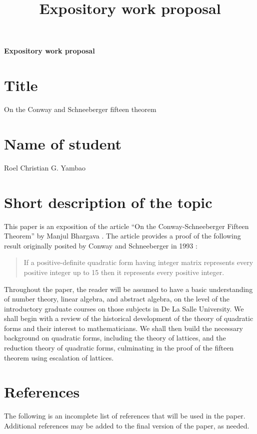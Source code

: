 \documentclass[11pt, letterpaper]{article}
\title{Expository work proposal}
\author{}
\date{}
\begin{document}
\thispagestyle{empty}

{\begin{center}
    \large\bfseries
    Expository work proposal    
\end{center}
}


\section*{Title}

On the Conway and Schneeberger fifteen theorem

\section*{Name of student}

Roel Christian G. Yambao

\section{Short description of the topic}

This paper is an exposition of the article ``On the Conway-Schneeberger Fifteen Theorem'' by Manjul Bhargava \cite{bhargava2000conway}. The article provides a proof of the following result originally posited by Conway and Schneeberger in 1993 \cite{conway1999universal,schneeberger1997arithmetic}:
\begin{quote}
    If a positive-definite quadratic form having integer matrix represents every positive integer up to 15 then it represents every positive integer.
\end{quote}

Throughout the paper, the reader will be assumed to have a basic understanding of number theory, linear algebra, and abstract algebra, on the level of the introductory graduate courses on those subjects in De La Salle University. We shall begin with a review of the historical development of the theory of quadratic forms and their interest to mathematicians. We shall then build the necessary background on quadratic forms, including the theory of lattices, and the reduction theory of quadratic forms, culminating in the proof of the fifteen theorem using escalation of lattices.

\section{References}

The following is an incomplete list of references that will be used in the paper. Additional references may be added to the final version of the paper, as needed.
\end{document}
